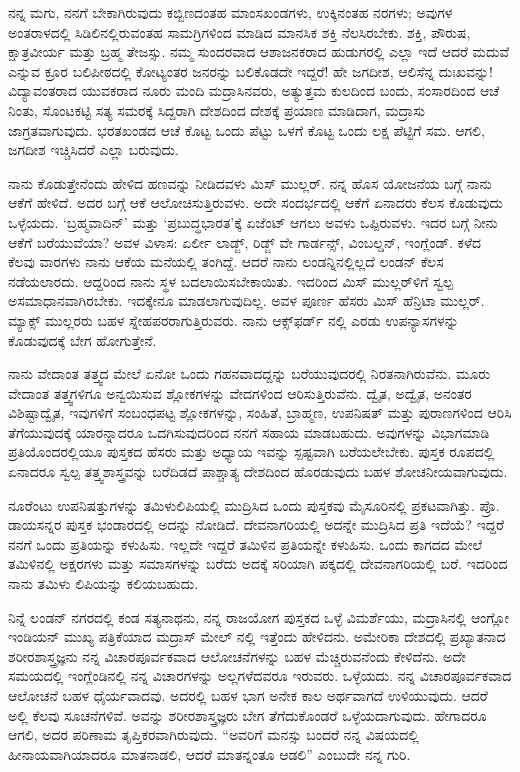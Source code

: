 ನನ್ನ ಮಗು, ನನಗೆ ಬೇಕಾಗಿರುವುದು ಕಬ್ಬಿಣದಂತಹ ಮಾಂಸಖಂಡಗಳು, ಉಕ್ಕಿನಂತಹ ನರಗಳು; ಅವುಗಳ ಅಂತರಾಳದಲ್ಲಿ ಸಿಡಿಲಿನಲ್ಲಿರುವಂತಹ ಸಾಮಗ್ರಿಗಳಿಂದ ಮಾಡಿದ ಮಾನಸಿಕ ಶಕ್ತಿ ನೆಲಸಿರಬೇಕು. ಶಕ್ತಿ, ಪೌರುಷ, ಕ್ಷಾತ್ರವೀರ್ಯ ಮತ್ತು ಬ್ರಹ್ಮ ತೇಜಸ್ಸು. ನಮ್ಮ ಸುಂದರವಾದ ಆಶಾಜನಕರಾದ ಹುಡುಗರಲ್ಲಿ ಎಲ್ಲಾ ಇದೆ\enginline{-} ಆದರೆ ಮದುವೆ ಎನ್ನುವ ಕ್ರೂರ ಬಲಿಪೀಠದಲ್ಲಿ ಕೋಟ್ಯಂತರ ಜನರನ್ನು ಬಲಿಕೊಡದೇ ಇದ್ದರೆ! ಹೇ ಜಗದೀಶ, ಆಲಿಸೆನ್ನ ದುಃಖವನ್ನು! ವಿದ್ಯಾವಂತರಾದ ಯುವಕರಾದ ನೂರು ಮಂದಿ ಮದ್ರಾಸಿನವರು, ಅತ್ಯುತ್ತಮ ಕುಲದಿಂದ ಬಂದು, ಸಂಸಾರದಿಂದ ಆಚೆ ನಿಂತು, ಸೊಂಟಕಟ್ಟಿ ಸತ್ಯ ಸಮರಕ್ಕೆ ಸಿದ್ದರಾಗಿ ದೇಶದಿಂದ ದೇಶಕ್ಕೆ ಪ್ರಯಾಣ ಮಾಡಿದಾಗ, ಮದ್ರಾಸು ಜಾಗ್ರತವಾಗುವುದು. ಭರತಖಂಡದ ಆಚೆ ಕೊಟ್ಟ ಒಂದು ಪೆಟ್ಟು ಒಳಗೆ ಕೊಟ್ಟ ಒಂದು ಲಕ್ಷ ಪೆಟ್ಟಿಗೆ ಸಮ. ಆಗಲಿ, ಜಗದೀಶ ಇಚ್ಚಿಸಿದರೆ ಎಲ್ಲಾ ಬರುವುದು.

ನಾನು ಕೊಡುತ್ತೇನೆಂದು ಹೇಳಿದ ಹಣವನ್ನು ನೀಡಿದವಳು ಮಿಸ್ ಮುಲ್ಲರ್. ನನ್ನ ಹೊಸ ಯೋಜನೆಯ ಬಗ್ಗೆ ನಾನು ಆಕೆಗೆ ಹೇಳಿದೆ. ಅದರ ಬಗ್ಗೆ ಆಕೆ ಆಲೋಚಿಸುತ್ತಿರುವಳು. ಅದೇ ಸಂದರ್ಭದಲ್ಲಿ ಆಕೆಗೆ ಏನಾದರು ಕೆಲಸ ಕೊಡುವುದು ಒಳ್ಳೆಯದು. ‘ಬ್ರಹ್ಮವಾದಿನ್’ ಮತ್ತು ‘ಪ್ರಬುದ್ಧಭಾರತ’ಕ್ಕೆ ಏಜೆಂಟ್ ಆಗಲು ಅವಳು ಒಪ್ಪಿರುವಳು. ಇದರ ಬಗ್ಗೆ ನೀನು ಆಕೆಗೆ ಬರೆಯುವೆಯಾ? ಅವಳ ವಿಳಾಸ: ಏರ್ಲೀ ಲಾಡ್ಜ್, ರಿಡ್ಜ್ ವೇ ಗಾರ್ಡನ್ಸ್, ವಿಂಬಲ್ಡನ್, ಇಂಗ್ಲೆಂಡ್. ಕಳೆದ ಕೆಲವು ವಾರಗಳು ನಾನು ಆಕೆಯ ಮನೆಯಲ್ಲಿ ತಂಗಿದ್ದೆ. ಆದರೆ ನಾನು ಲಂಡನ್ನಿನಲ್ಲಿಲ್ಲದೆ ಲಂಡನ್ ಕೆಲಸ ನಡೆಯಲಾರದು. ಆದ್ದರಿಂದ ನಾನು ಸ್ಥಳ ಬದಲಾಯಿಸಬೇಕಾಯಿತು. ಇದರಿಂದ ಮಿಸ್ ಮುಲ್ಲರ್‌ಳಿಗೆ ಸ್ವಲ್ಪ ಅಸಮಾಧಾನವಾಗಿರಬೇಕು. ಇದಕ್ಕೇನೂ ಮಾಡಲಾಗುವುದಿಲ್ಲ. ಅವಳ ಪೂರ್ಣ ಹೆಸರು ಮಿಸ್ ಹೆನ್ರಿಟಾ ಮುಲ್ಲರ್. ಮ್ಯಾಕ್ಸ್ ಮುಲ್ಲರರು ಬಹಳ ಸ್ನೇಹಪರರಾಗುತ್ತಿರುವರು. ನಾನು ಆಕ್ಸ್‌ಫ‌ರ್ಡ್ ನಲ್ಲಿ ಎರಡು ಉಪನ್ಯಾಸಗಳನ್ನು ಕೊಡುವುದಕ್ಕೆ ಬೇಗ ಹೋಗುತ್ತೇನೆ.

ನಾನು ವೇದಾಂತ ತತ್ತ್ವದ ಮೇಲೆ ಏನೋ ಒಂದು ಗಹನವಾದದ್ದನ್ನು ಬರೆಯುವುದರಲ್ಲಿ ನಿರತನಾಗಿರುವೆನು. ಮೂರು ವೇದಾಂತ ತತ್ತ್ವಗಳಿಗೂ ಅನ್ವಯಿಸುವ ಶ್ಲೋಕಗಳನ್ನು ವೇದಗಳಿಂದ ಆರಿಸುತ್ತಿರುವೆನು. ದ್ವೈತ, ಅದ್ವೈತ, ಅನಂತರ ವಿಶಿಷ್ಟಾದ್ವೈತ, ಇವುಗಳಿಗೆ ಸಂಬಂಧಪಟ್ಟ ಶ್ಲೋಕಗಳನ್ನು, ಸಂಹಿತೆ, ಬ್ರಾಹ್ಮಣ, ಉಪನಿಷತ್ ಮತ್ತು ಪುರಾಣಗಳಿಂದ ಆರಿಸಿ ತೆಗೆಯುವುದಕ್ಕೆ ಯಾರನ್ನಾದರೂ ಒದಗಿಸುವುದರಿಂದ ನನಗೆ ಸಹಾಯ ಮಾಡಬಹುದು. ಅವುಗಳನ್ನು ವಿಭಾಗಮಾಡಿ ಪ್ರತಿಯೊಂದರಲ್ಲಿಯೂ ಪುಸ್ತಕದ ಹೆಸರು ಮತ್ತು ಅಧ್ಯಾಯ ಇವನ್ನು ಸ್ಪಷ್ಟವಾಗಿ ಬರೆಯಲೇಬೇಕು. ಪುಸ್ತಕ ರೂಪದಲ್ಲಿ ಏನಾದರೂ ಸ್ವಲ್ಪ ತತ್ತ್ವಶಾಸ್ತ್ರವನ್ನು ಬರೆದಿಡದೆ ಪಾಶ್ಚಾತ್ಯ ದೇಶದಿಂದ ಹೊರಡುವುದು ಬಹಳ ಶೋಚನೀಯವಾಗುವುದು.

ನೂರೆಂಟು ಉಪನಿಷತ್ತುಗಳನ್ನು ತಮಿಳುಲಿಪಿಯಲ್ಲಿ ಮುದ್ರಿಸಿದ ಒಂದು ಪುಸ್ತಕವು ಮೈಸೂರಿನಲ್ಲಿ ಪ್ರಕಟವಾಗಿತ್ತು. ಪ್ರೊ. ಡಾಯಸನ್ನರ ಪುಸ್ತಕ ಭಂಡಾರದಲ್ಲಿ ಅದನ್ನು ನೋಡಿದೆ. ದೇವನಾಗರಿಯಲ್ಲಿ ಅದನ್ನೇ ಮುದ್ರಿಸಿದ ಪ್ರತಿ ಇದೆಯೆ? ಇದ್ದರೆ ನನಗೆ ಒಂದು ಪ್ರತಿಯನ್ನು ಕಳುಹಿಸು. ಇಲ್ಲದೇ ಇದ್ದರೆ ತಮಿಳಿನ ಪ್ರತಿಯನ್ನೇ ಕಳುಹಿಸು. ಒಂದು ಕಾಗದದ ಮೇಲೆ ತಮಿಳಿನಲ್ಲಿ ಅಕ್ಷರಗಳು ಮತ್ತು ಸಮಾಸಗಳನ್ನು ಬರೆದು ಅದಕ್ಕೆ ಸರಿಯಾಗಿ ಪಕ್ಕದಲ್ಲಿ ದೇವನಾಗರಿಯಲ್ಲಿ ಬರೆ. ಇದರಿಂದ ನಾನು ತಮಿಳು ಲಿಪಿಯನ್ನು ಕಲಿಯಬಹುದು.

ನಿನ್ನೆ ಲಂಡನ್ ನಗರದಲ್ಲಿ ಕಂಡ ಸತ್ಯನಾಥನು, ನನ್ನ ರಾಜಯೋಗ ಪುಸ್ತಕದ ಒಳ್ಳೆ ವಿಮರ್ಶೆಯು, ಮದ್ರಾಸಿನಲ್ಲಿ ಆಂಗ್ಲೋ ಇಂಡಿಯನ್ ಮುಖ್ಯ ಪತ್ರಿಕೆಯಾದ ಮದ್ರಾಸ್ ಮೇಲ್ ನಲ್ಲಿ ಇತ್ತೆಂದು ಹೇಳಿದನು. ಅಮೇರಿಕಾ ದೇಶದಲ್ಲಿ ಪ್ರಖ್ಯಾತನಾದ ಶರೀರಶಾಸ್ತ್ರಜ್ಞನು ನನ್ನ ವಿಚಾರಪೂರ್ವಕವಾದ ಆಲೋಚನೆಗಳನ್ನು ಬಹಳ ಮೆಚ್ಚಿರುವನೆಂದು ಕೇಳಿದೆನು. ಅದೇ ಸಮಯದಲ್ಲಿ ಇಂಗ್ಲೆಂಡಿನಲ್ಲಿ ನನ್ನ ವಿಚಾರಗಳನ್ನು ಅಲ್ಲಗಳೆದವರೂ ಇರುವರು. ಒಳ್ಳೆಯದು. ನನ್ನ ವಿಚಾರಪೂರ್ವಕವಾದ ಆಲೋಚನೆ ಬಹಳ ಧೈರ್ಯವಾದವು. ಅದರಲ್ಲಿ ಬಹಳ ಭಾಗ ಅನೇಕ ಕಾಲ ಅರ್ಥವಾಗದೆ ಉಳಿಯುವುದು. ಆದರೆ ಅಲ್ಲಿ ಕೆಲವು ಸೂಚನೆಗಳಿವೆ. ಅವನ್ನು ಶರೀರಶಾಸ್ತ್ರಜ್ಞರು ಬೇಗ ತೆಗೆದುಕೊಂಡರೆ ಒಳ್ಳೆಯದಾಗುವುದು. ಹೇಗಾದರೂ ಆಗಲಿ, ಅದರ ಪರಿಣಾಮ ತೃಪ್ತಿಕರವಾಗಿರುವುದು. ``ಅವರಿಗೆ ಮನಸ್ಸು ಬಂದರೆ ನನ್ನ ವಿಷಯದಲ್ಲಿ ಹೀನಾಯವಾಗಿಯಾದರೂ ಮಾತನಾಡಲಿ, ಆದರೆ ಮಾತನ್ನಂತೂ ಆಡಲಿ'' ಎಂಬುದೇ ನನ್ನ ಗುರಿ.

